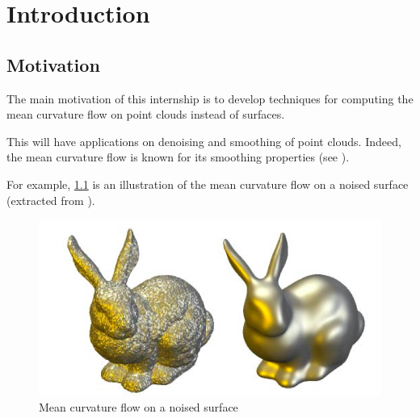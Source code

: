



\chapter{Introduction}


\section{Motivation}

The main motivation of this internship is to develop techniques for computing the
mean curvature flow on point clouds instead of surfaces.

This will have applications on denoising and smoothing of point clouds. Indeed,
the mean curvature flow is known for its smoothing properties (see
\cite{ciomaga2010level}).

For example, \ref{fig:mean-curvature-flow-ex} is an illustration of the mean
curvature flow on a noised surface (extracted from
\cite{clarenz2000anisotropic}).

\begin{figure}[h]
    \centering
    \includegraphics[scale=0.3]{img/mean-curvature-flow-rabbit}
    \caption{Mean curvature flow on a noised surface}
    \label{fig:mean-curvature-flow-ex}
\end{figure}

